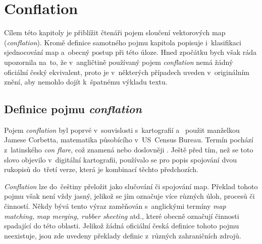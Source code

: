 \chapter{Conflation}
\label{2-conflation}

Cílem této kapitoly je přiblížit čtenáři pojem sloučení vektorových map
(\textit{conflation}). Kro\-mě definice samotného pojmu kapitola popisuje 
i~klasifikaci sjednocování map a~obecný postup při této úloze. Hned zpočátku
bych však ráda upozornila na~to, že v~angličtině používaný pojem 
\textit{conflation} nemá žádný oficiální český ekvivalent, proto je v~některých
případech uveden v~originálním znění, aby nemohlo dojít k~špatnému výkladu 
textu.

\section{Definice pojmu \textit{conflation}}
\label{definice}

Pojem \textit{conflation} byl poprvé v~souvislosti s~kartografií a~
použit manželkou Jamese Corbetta, matematika působícího v~US~Census Bureau.
Termín pochází z~latinského \textit{con flare}, což znamená 
nebo doslovněji . Ještě před tím, než se toto slovo 
objevilo v~digitální kartografii, používalo se pro popis spojování dvou 
rukopisů do~třetí verze, která je kombinací těchto předchozích.

\textit{Conflation} lze do~češtiny přeložit jako slučování či spojování map. 
Překlad tohoto pojmu však není vždy jasný, jelikož se jím označuje více různých 
úloh, procesů či činností. Někdy bývá tento výraz zaměňován s~anglickými 
termíny \textit{map matching, map merging, rubber sheeting} atd., které obecně
označují činnosti spadající do této oblasti. Jelikož žádná oficiální česká
definice tohoto pojmu neexistuje, jsou zde uvedeny překlady definic z~různých 
zahraničních zdrojů. 

